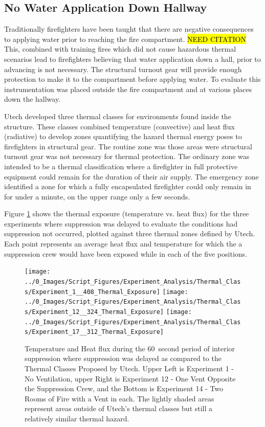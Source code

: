 \documentclass[12pt,oneside]{book}
\begin{document}
\subsection{No Water Application Down Hallway}
Traditionally firefighters have been taught that there are negative consequences to applying water prior to reaching the fire compartment. \hl{NEED CITATION} This, combined with training fires which did not cause hazardous thermal scenarios lead to firefighters believing that water application down a hall, prior to advancing is not necessary. The structural turnout gear will provide enough protection to make it to the compartment before applying water. To evaluate this instrumentation was placed outside the fire compartment and at various places down the hallway.

Utech developed three thermal classes for environments found inside the structure. These classes combined temperature (convective) and heat flux (radiative) to develop zones quantifying the hazard thermal energy poses to firefighters in structural gear. The routine zone was those areas were structural turnout gear was not necessary for thermal protection. The ordinary zone was intended to be a thermal classification where a firefighter in full protective equipment could remain for the duration of their air supply. The emergency zone identified a zone for which a fully encapsulated firefighter could only remain in for under a minute, on the upper range only a few seconds.  

Figure \ref{fig:Thermal_Classes_Approach_Delayed_Suppression} shows the thermal exposure (temperature vs. heat flux) for the three experiments where suppression was delayed to evaluate the conditions had suppression not occurred, plotted against three thermal zones defined by Utech. Each point represents an average heat flux and temperature for which the a suppression crew would have been exposed while in each of the five positions. 

\begin{figure}[H]
\centering
\texttt{[image: ../0\_Images/Script\_Figures/Experiment\_Analysis/Thermal\_Class/Experiment\_1\_\_408\_Thermal\_Exposure]} 
\texttt{[image: ../0\_Images/Script\_Figures/Experiment\_Analysis/Thermal\_Class/Experiment\_12\_\_324\_Thermal\_Exposure]}
\texttt{[image: ../0\_Images/Script\_Figures/Experiment\_Analysis/Thermal\_Class/Experiment\_17\_\_312\_Thermal\_Exposure]} 
\caption[Delayed Suppression Hallway Thermal Class Comparison]{Temperature and Heat flux during the 60~second period of interior suppression where suppression was delayed as compared to the Thermal Classes Proposed by Utech. Upper Left is Experiment 1 - No Ventilation, upper Right is Experiment 12 - One Vent Opposite the Suppression Crew, and the Bottom is Experiment 14 - Two Rooms of Fire with a Vent in each. The lightly shaded areas represent areas outside of Utech's thermal classes but still a relatively similar thermal hazard.}
\label{fig:Thermal_Classes_Approach_Delayed_Suppression}
\end{figure}
\end{document}
